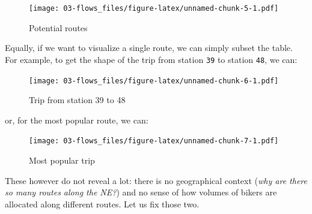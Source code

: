 \documentclass[]{book}
\newenvironment{Shaded}{\begin{snugshade}}{\end{snugshade}}
\newcommand{\DecValTok}[1]{\textcolor[rgb]{0.00,0.00,0.81}{#1}}
\newcommand{\KeywordTok}[1]{\textcolor[rgb]{0.13,0.29,0.53}{\textbf{#1}}}
\newcommand{\NormalTok}[1]{#1}
\newcommand{\OperatorTok}[1]{\textcolor[rgb]{0.81,0.36,0.00}{\textbf{#1}}}
\newcommand{\StringTok}[1]{\textcolor[rgb]{0.31,0.60,0.02}{#1}}
\begin{document}
\begin{figure}
\centering
\texttt{[image: 03-flows\_files/figure-latex/unnamed-chunk-5-1.pdf]}
\caption{\label{fig:unnamed-chunk-5}Potential routes}
\end{figure}

Equally, if we want to visualize a single route, we can simply subset the table. For example, to get the shape of the trip from station \texttt{39} to station \texttt{48}, we can:

\begin{Shaded}
\end{Shaded}

\begin{figure}
\centering
\texttt{[image: 03-flows\_files/figure-latex/unnamed-chunk-6-1.pdf]}
\caption{\label{fig:unnamed-chunk-6}Trip from station 39 to 48}
\end{figure}

or, for the most popular route, we can:

\begin{Shaded}
\end{Shaded}

\begin{figure}
\centering
\texttt{[image: 03-flows\_files/figure-latex/unnamed-chunk-7-1.pdf]}
\caption{\label{fig:unnamed-chunk-7}Most popular trip}
\end{figure}

These however do not reveal a lot: there is no geographical context (\emph{why are there so many routes along the NE?}) and no sense of how volumes of bikers are allocated along different routes. Let us fix those two.
\end{document}
